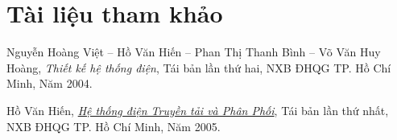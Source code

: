 \section*{Tài liệu tham khảo}
\begin{enumerate}[{[1].}]
	\item Nguyễn Hoàng Việt -- Hồ Văn Hiến -- Phan Thị Thanh Bình -- Võ Văn Huy Hoàng, \emph{Thiết kế hệ thống điện}, Tái bản lần thứ hai, NXB ĐHQG TP. Hồ Chí Minh, Năm 2004.
	
	\item Hồ Văn Hiến, \href{https://github.com/h3int2um/hethongdien/blob/master/tailieu-hethongdien/HoVanHien_HeThongDien_TruyenTai_PhanPhoi_NXB_DHQGHCM_N2005_TBL1_564T.pdf}{\emph{Hệ thống điện Truyền tải và Phân Phối}}, Tái bản lần thứ nhất, NXB ĐHQG TP. Hồ Chí Minh, Năm 2005.
\end{enumerate}
